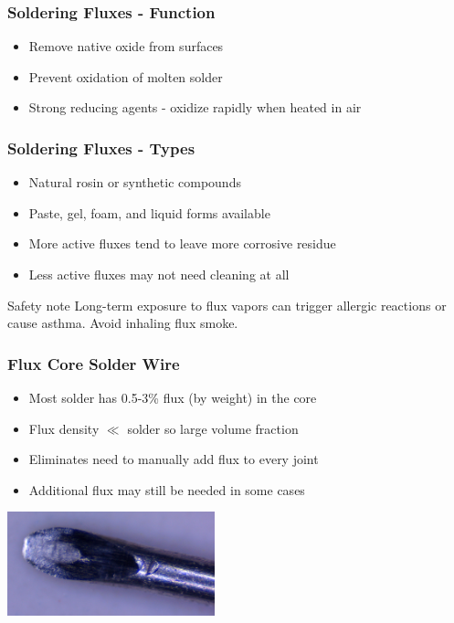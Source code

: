 \documentclass{beamer}
\begin{document}
\begin{frame}
\frametitle{Soldering Fluxes - Function}
\begin{itemize}
\item Remove native oxide from surfaces
\item Prevent oxidation of molten solder
\item Strong reducing agents - oxidize rapidly when heated in air
\end{itemize}
\end{frame}

\begin{frame}
\frametitle{Soldering Fluxes - Types}
\begin{itemize}
\item Natural rosin or synthetic compounds
\item Paste, gel, foam, and liquid forms available
\item More active fluxes tend to leave more corrosive residue
\item Less active fluxes may not need cleaning at all
\end{itemize}
\begin{alertblock}{Safety note}
Long-term exposure to flux vapors can trigger allergic reactions or cause asthma. Avoid inhaling flux smoke.
\end{alertblock}
\end{frame}

\begin{frame}
\frametitle{Flux Core Solder Wire}
\begin{itemize}
\item Most solder has 0.5-3\% flux (by weight) in the core
\item Flux density $\ll$ solder so large volume fraction
\item Eliminates need to manually add flux to every joint
\item Additional flux may still be needed in some cases
\end{itemize}
\begin{center}
\includegraphics[width=6cm,keepaspectratio]{flux-core.jpg}
\end{center}
\end{frame}
\end{document}
